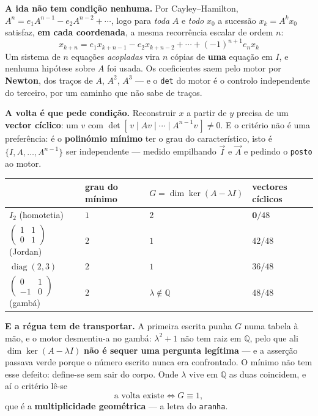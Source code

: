\documentclass[11pt,a4paper]{article}
\newcommand{\code}[1]{\texttt{\small #1}}
\newcommand{\Q}{\ensuremath{\mathbb{Q}}}
\begin{document}
\medskip\noindent\textbf{A ida não tem condição nenhuma.} Por Cayley--Hamilton,
$A^{n}=e_{1}A^{n-1}-e_{2}A^{n-2}+\cdots$, logo para \emph{toda} $A$ e \emph{todo}
$x_{0}$ a sucessão $x_{k}=A^{k}x_{0}$ satisfaz, \textbf{em cada coordenada}, a
mesma recorrência escalar de ordem $n$:
\[
\boxed{\;x_{k+n}=e_{1}x_{k+n-1}-e_{2}x_{k+n-2}+\cdots+(-1)^{n+1}e_{n}x_{k}\;}
\]
Um sistema de $n$ equações \emph{acopladas} vira $n$ cópias de \textbf{uma}
equação em $I$, e nenhuma hipótese sobre $A$ foi usada. Os coeficientes saem pelo
motor por \textbf{Newton}, dos traços de $A$, $A^{2}$, $A^{3}$ --- e o \code{det}
do motor é o controlo independente do terceiro, por um caminho que não sabe de
traços.

\medskip\noindent\textbf{A volta é que pede condição.} Reconstruir $x$ a partir
de $y$ precisa de um \textbf{vector cíclico}: um $v$ com
$\det[\,v\mid Av\mid\cdots\mid A^{n-1}v\,]\neq0$. E o critério não é uma
preferência: é o \textbf{polinómio mínimo} ter o grau do característico, isto é
$\{I,A,\dots,A^{n-1}\}$ ser independente --- medido empilhando $\vec I$ e $\vec A$
e pedindo o \code{posto} ao motor.
\begin{center}
\begin{tabular}{@{}llll@{}}
\toprule
 & grau do mínimo & $G=\dim\ker(A-\lambda I)$ & vectores cíclicos\\
\midrule
$I_2$ (homotetia)                  & $1$ & $2$ & $\mathbf{0}/48$\\
$\left(\begin{smallmatrix}1&1\\0&1\end{smallmatrix}\right)$ (Jordan) & $2$ & $1$ & $42/48$\\
$\operatorname{diag}(2,3)$         & $2$ & $1$ & $36/48$\\
$\left(\begin{smallmatrix}0&1\\-1&0\end{smallmatrix}\right)$ (gambá) & $2$ & $\lambda\notin\Q$ & $48/48$\\
\bottomrule
\end{tabular}
\end{center}

\medskip\noindent\textbf{E a régua tem de transportar.} A primeira escrita punha
$G$ numa tabela à mão, e o motor desmentiu-a no gambá: $\lambda^{2}+1$ não tem
raiz em $\Q$, pelo que ali $\dim\ker(A-\lambda I)$ \textbf{não é sequer uma
pergunta legítima} --- e a asserção passava verde porque o número escrito nunca
era confrontado. O mínimo não tem esse defeito: define-se sem sair do corpo. Onde
$\lambda$ vive em $\Q$ as duas coincidem, e aí o critério lê-se
\[
\text{a volta existe}\iff G\equiv1,
\]
que é a \textbf{multiplicidade geométrica} --- a letra do \code{aranha}.
\end{document}
